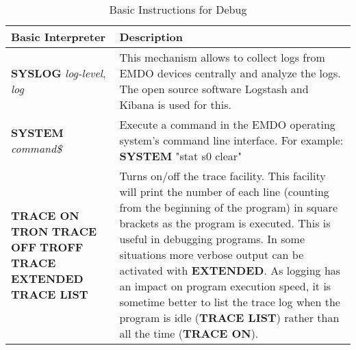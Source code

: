 \begin{table}[]
\centering
\caption{Basic Instructions for Debug}
\label{Basic_Instructions_for_Debug}
\begin{tabular}{|p{4cm}|p{10cm}|}
\hline
\textbf{Basic Interpreter} & \textbf{Description}                                                   \\ \hline
\textbf{SYSLOG} \textit{log-level}, \textit{log} 
& This mechanism allows to collect logs from EMDO devices centrally and analyze the logs. The open source software Logstash and Kibana is used for this.
\\ \hline
\textbf{SYSTEM} \textit{command\$}
& Execute a command in the EMDO operating system's command line interface. \newline
For example:\newline
\textbf{SYSTEM} "stat s0 clear"
\\ \hline
\textbf{TRACE ON}\newline
\textbf{TRON}\newline
\textbf{TRACE OFF}\newline
\textbf{TROFF}\newline
\textbf{TRACE EXTENDED}\newline
\textbf{TRACE LIST}
&  Turns on/off the trace facility. This facility will print the number of each line
(counting from the beginning of the program) in square brackets as the
program is executed. This is useful in debugging programs.\newline
In some situations more verbose output can be activated with \textbf{EXTENDED}.\newline
As logging has an impact on program execution speed, it is sometime better to list the trace log when the program is idle (\textbf{TRACE LIST}) rather than all the time (\textbf{TRACE ON}). 
\\ \hline
\end{tabular}
\end{table}


